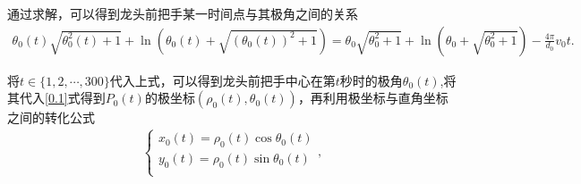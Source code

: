 \documentclass{cumcmthesis}
\begin{document}
    
    \par 通过求解，可以得到龙头前把手某一时间点与其极角之间的关系
    \begin{align}\label{1.........2}
        \theta _0(t)\sqrt{\theta _{0}^{2}(t)+1}+\ln (\theta _0(t)+\sqrt{(\theta _0(t))^2+1}) =\theta _0\sqrt{\theta _{0}^{2}+1}+\ln (\theta _0+\sqrt{\theta _{0}^{2}+1}) -\frac{4\pi}{d_0}v_0t .
        \end{align}
    \par 将\(t\in \{ 1,2,\cdots ,300 \}\)代入上式，可以得到龙头前把手中心在第\(t\)秒时的极角\(\theta _0(t)\),将其代入\eqref{0.1}式得到\(P_0(t)\)的极坐标\((\rho _0(t),\theta _0(t))\)，再利用极坐标与直角坐标之间的转化公式
        \begin{align}
        \begin{cases}
        x_0(t)=\rho _0(t)\cos \theta _0(t)\\
        y_0(t)=\rho _0(t)\sin \theta _0(t)\\
        \end{cases},\label{1.........3}
        \end{align}
\end{document}
